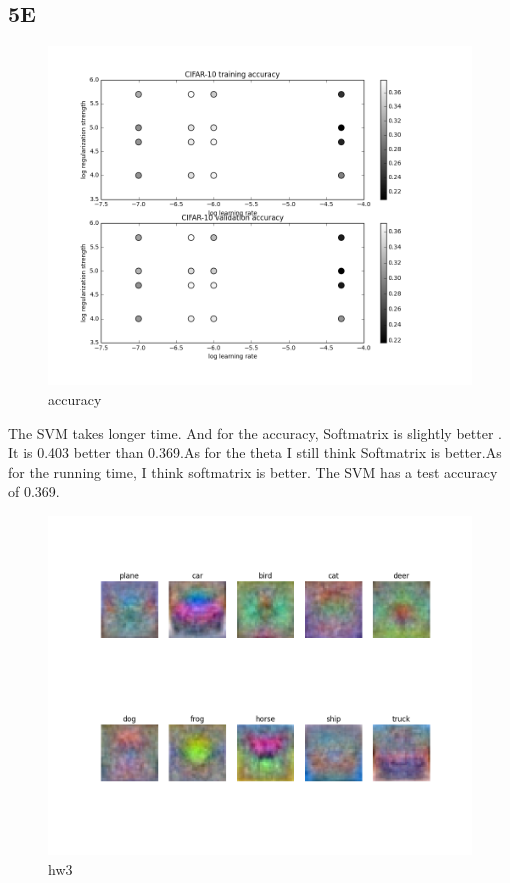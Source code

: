 \documentclass[pdftex,11pt]{article}
\begin{document}
\subsection{5E }
 \begin{figure}[H]
  \caption{accuracy}
  \centering
    \includegraphics[scale=0.5]{visz.png}
\end{figure}
The SVM takes longer time. And for the accuracy, Softmatrix is slightly better . It is 0.403 better than 0.369.As for the theta I still think Softmatrix is better.As for the running time, I think softmatrix is better. 
The SVM has a test accuracy of 0.369.
\begin{figure}[H]
  \caption{hw3}
  \centering
    \includegraphics[scale=0.5]{classifernew.png}
\end{figure}
\end{document}
